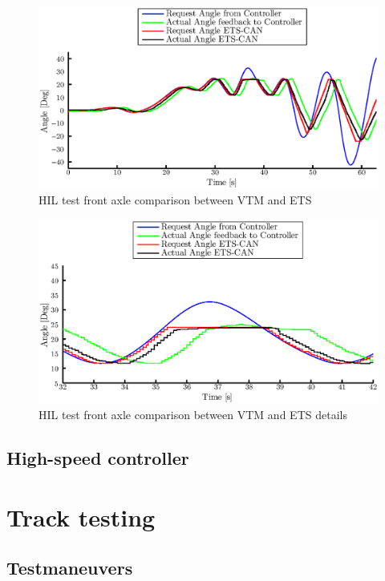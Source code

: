 \documentclass[ExampleMasters.tex]{subfiles}
\begin{document}
\begin{figure}[h]
	\centering
	\includegraphics[width=1\linewidth]{figures/HIL002_alles}
	\caption{HIL test front axle comparison between \gls{VTM}  and ETS}
	
	\label{fig:HIL002_complete}
\end{figure}
\begin{figure}[h]
	\centering
	\includegraphics[width=1\linewidth]{figures/HIL002_alles_details}
	\caption{HIL test front axle comparison between \gls{VTM}  and \gls{ETS} details}
	
	\label{fig:HIL002_complete_details}
\end{figure}
\subsection{High-speed controller}

\section{Track testing}
\label{sec:track-testing}

\subsection{Testmaneuvers}
\end{document}

